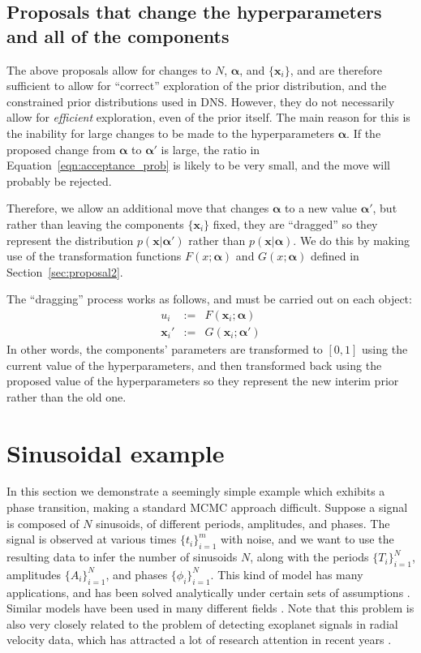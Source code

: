 \documentclass[letterpaper, 11pt]{article}
\newcommand{\hyperparams}{\boldsymbol{\alpha}}
\newcommand{\xx}{\mathbf{x}}
\begin{document}
\subsection{Proposals that change the hyperparameters
and all of the components}\label{sec:proposal4}
The above proposals allow for changes to $N$, $\hyperparams$, and $\{\xx_i\}$,
and are therefore sufficient to allow for ``correct'' exploration of the
prior distribution, and the constrained prior distributions used in DNS.
However, they do not necessarily allow for {\it efficient} exploration, even
of the prior itself. The main reason for this is the inability for large
changes to be made to the hyperparameters $\hyperparams$. If the proposed change
from $\hyperparams$ to $\hyperparams'$ is large, the ratio in
Equation~\ref{eqn:acceptance_prob} is likely to be very small, and the move
will probably be rejected.

Therefore, we allow an additional move that changes $\hyperparams$ to a new
value $\hyperparams'$, but rather than leaving the components $\{\xx_i\}$ fixed,
they are ``dragged''
so they represent the distribution $p(\xx | \hyperparams')$ rather than
$p(\xx|\hyperparams)$. We do this by making use of the transformation functions
$F(x; \hyperparams)$ and $G(x; \hyperparams)$ defined in
Section~\ref{sec:proposal2}.

The ``dragging'' process works as follows, and must be carried out on
each object:
\begin{eqnarray}
u_i &:=& F(\xx_i; \hyperparams)\\
\xx_i' &:=& G(\xx_i; \hyperparams')
\end{eqnarray}
In other words, the components' parameters are transformed to $[0,1]$ using the
current value of the hyperparameters, and then transformed back using the
proposed value of the hyperparameters so they represent the new interim prior
rather than the old one.

\section{Sinusoidal example}\label{sec:sinewaves}
In this section we demonstrate a seemingly simple example which exhibits
a phase transition, making a standard MCMC approach difficult. Suppose
a signal is composed of $N$ sinusoids, of different periods, amplitudes,
and phases. The signal is observed at various times $\{t_i\}_{i=1}^m$ with
noise, and we want to use the resulting data to infer the number of sinusoids
$N$, along with the periods $\{T_i\}_{i=1}^N$, amplitudes $\{A_i\}_{i=1}^N$,
and phases $\{\phi_i\}_{i=1}^N$.
This kind of model has many applications, and has been solved analytically
under certain sets of assumptions \citep[see e.g.][]{bretthorst, 2014arXiv1412.0467M}.
Similar
models have been used in many different fields
\citep[e.g.][]{2003AIPC..659....3B, 2005PhRvD..72b2001U, 2007ApJ...654..551B,
2009MNRAS.395.2226B}.
Note that this problem is also very closely related to the
problem of detecting exoplanet signals in radial velocity data, which has
attracted a lot of research attention in recent years
\citep[e.g.][]{gregory, fengji, 2011MNRAS.415.3462F}.
\end{document}
